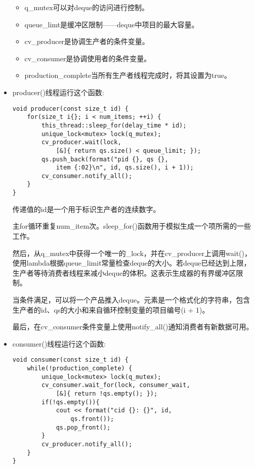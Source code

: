 \begin{itemize}
\begin{itemize}
\item 
q\_mutex可以对deque的访问进行控制。

\item 
queue\_limt是缓冲区限制——deque中项目的最大容量。

\item 
cv\_producer是协调生产者的条件变量。

\item 
cv\_consumer是协调使用者的条件变量。

\item 
production\_complete当所有生产者线程完成时，将其设置为true。
\end{itemize}

\item 
producer()线程运行这个函数:

\begin{lstlisting}[style=styleCXX]
void producer(const size_t id) {
	for(size_t i{}; i < num_items; ++i) {
		this_thread::sleep_for(delay_time * id);
		unique_lock<mutex> lock(q_mutex);
		cv_producer.wait(lock,
			[&]{ return qs.size() < queue_limit; });
		qs.push_back(format("pid {}, qs {},
			item {:02}\n", id, qs.size(), i + 1));
		cv_consumer.notify_all();
	}
}
\end{lstlisting}

传递值的id是一个用于标识生产者的连续数字。

主for循环重复num\_item次。sleep\_for()函数用于模拟生成一个项所需的一些工作。

然后，从q\_mutex中获得一个唯一的\_lock，并在cv\_producer上调用wait()，使用lambda根据queue\_limit常量检查deque的大小。若deque已经达到上限，生产者等待消费者线程来减小deque的体积。这表示生成器的有界缓冲区限制。

当条件满足，可以将一个产品推入deque。元素是一个格式化的字符串，包含生产者的id、qs的大小和来自循环控制变量的项目编号(i + 1)。

最后，在cv\_consumer条件变量上使用notify\_all()通知消费者有新数据可用。

\item 
consumer()线程运行这个函数:

\begin{lstlisting}[style=styleCXX]
void consumer(const size_t id) {
	while(!production_complete) {
		unique_lock<mutex> lock(q_mutex);
		cv_consumer.wait_for(lock, consumer_wait,
			[&]{ return !qs.empty(); });
		if(!qs.empty()){
			cout << format("cid {}: {}", id,
				qs.front());
			qs.pop_front();
		}
		cv_producer.notify_all();
	}
}
\end{lstlisting}


\end{itemize}
